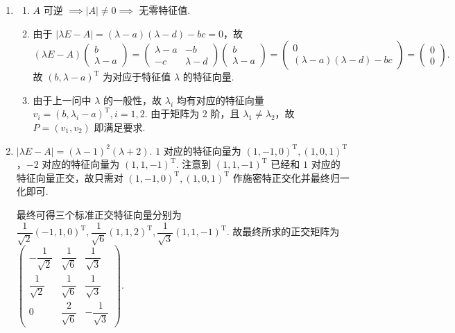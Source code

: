 \begin{enumerate}
    \item
    \begin{enumerate}
        \item $A$ 可逆 $\implies |A| \neq 0 \implies$ 无零特征值.
        \item 由于 $|\lambda E - A|=(\lambda-a)(\lambda-d)-bc = 0$，故
        \[
        (\lambda E - A) \begin{pmatrix} b \\ \lambda-a \end{pmatrix} = \begin{pmatrix} \lambda - a & -b \\ -c & \lambda - d \end{pmatrix} \begin{pmatrix} b \\ \lambda-a \end{pmatrix} = \begin{pmatrix} 0 \\ (\lambda-a)(\lambda-d)-bc \end{pmatrix} = \begin{pmatrix} 0 \\ 0 \end{pmatrix}.\] 故 $(b, \lambda - a)^\mathrm{T}$ 为对应于特征值 $\lambda$ 的特征向量.
        \item 由于上一问中 $\lambda$ 的一般性，故 $\lambda_i$ 均有对应的特征向量 $v_i = (b, \lambda_i - a)^\mathrm{T}, i=1,2$. 由于矩阵为 $2$ 阶，且 $\lambda_1 \neq \lambda_2$，故 $P=(v_1, v_2)$ 即满足要求.
    \end{enumerate}

    \item $|\lambda E - A| = (\lambda-1)^2(\lambda+2)$. $1$ 对应的特征向量为 $(1,-1,0)^\mathrm{T}, (1,0,1)^\mathrm{T}$，$-2$ 对应的特征向量为 $(1,1,-1)^\mathrm{T}$. 注意到 $(1,1,-1)^\mathrm{T}$ 已经和 $1$ 对应的特征向量正交，故只需对 $(1,-1,0)^\mathrm{T}, (1,0,1)^\mathrm{T}$ 作施密特正交化并最终归一化即可.

    最终可得三个标准正交特征向量分别为 $\dfrac{1}{\sqrt{2}}(-1,1,0)^\mathrm{T}, \dfrac{1}{\sqrt{6}}(1,1,2)^\mathrm{T}, \dfrac{1}{\sqrt{3}}(1,1,-1)^\mathrm{T}$. 故最终所求的正交矩阵为 $\begin{pmatrix}
        -\dfrac{1}{\sqrt{2}} & \dfrac{1}{\sqrt{6}} & \dfrac{1}{\sqrt{3}} \\[0.5em]
        \dfrac{1}{\sqrt{2}} & \dfrac{1}{\sqrt{6}} & \dfrac{1}{\sqrt{3}} \\[0.5em]
        0 & \dfrac{2}{\sqrt{6}} & -\dfrac{1}{\sqrt{3}}
    \end{pmatrix}$.


\end{enumerate}
